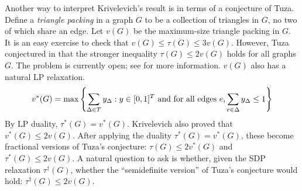 Another way to interpret Krivelevich's result is in terms of a conjecture of Tuza. Define a {\it triangle packing} in a graph $G$ to be a collection of triangles in $G$, no two of which share an edge. Let $v(G)$ be the maximum-size triangle packing in $G$. It is an easy exercise to check that $v(G) \le \tau(G) \le 3v(G)$. However, Tuza conjectured in \cite{tuza} that the stronger inequality $\tau(G) \le 2v(G)$ holds for all graphs $G$. The problem is currently open; see \cite{haxell} for more information. $v(G)$ also has a natural LP relaxation.
$$v^*(G) = \max \left\{\sum_{\Delta \in T} y_\Delta: y \in [0,1]^T \hbox{ and for all edges $e$,} \sum_{e \in \Delta} y_\Delta \le 1\right\}$$
By LP duality, $\tau^*(G) = v^*(G)$. Krivelevich \cite{krivelevich} also proved that  $v^*(G) \le 2v(G)$. After applying the duality $\tau^*(G) = v^*(G)$, these become fractional versions of Tuza's conjecture: $\tau(G) \le 2v^*(G)$ and $\tau^*(G) \le 2v(G)$. A natural question to ask is whether, given the SDP relaxation $\tau^\dagger(G)$, whether the ``semidefinite version'' of Tuza's conjecture would hold: $\tau^\dagger(G) \le 2v(G)$.
